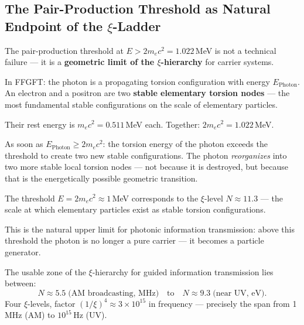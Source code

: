 \subsection{The Pair-Production Threshold as Natural
  Endpoint of the \texorpdfstring{$\xi$}{xi}-Ladder}
\label{sec:pair-production}

The pair-production threshold at $E > 2 m_e c^2 = 1.022$\,MeV
is not a technical failure ---
it is a \textbf{geometric limit of the $\xi$-hierarchy}
for carrier systems.

In FFGFT: the photon is a propagating
torsion configuration with energy $E_\text{Photon}$.
An electron and a positron are two
\textbf{stable elementary torsion nodes} ---
the most fundamental stable configurations
on the scale of elementary particles.

Their rest energy is $m_e c^2 = 0.511$\,MeV each.
Together: $2 m_e c^2 = 1.022$\,MeV.

As soon as $E_\text{Photon} \geq 2 m_e c^2$:
the torsion energy of the photon exceeds
the threshold to create two new stable configurations.
The photon \emph{reorganizes} into
two more stable local torsion nodes ---
not because it is destroyed,
but because that is the energetically possible
geometric transition.

\begin{keyresult}
The threshold $E = 2 m_e c^2 \approx 1$\,MeV
corresponds to the $\xi$-level $N \approx 11.3$ ---
the scale at which elementary particles exist as stable
torsion configurations.

This is the natural upper limit for photonic
information transmission:
above this threshold the photon is no longer
a pure carrier --- it becomes a particle generator.

The usable zone of the $\xi$-hierarchy for
guided information transmission lies between:
\begin{equation}
  N \approx 5.5 \;\text{(AM broadcasting, MHz)}
  \quad\text{to}\quad
  N \approx 9.3 \;\text{(near UV, eV)}.
\end{equation}
Four $\xi$-levels, factor $(1/\xi)^4 \approx 3 \times 10^{15}$
in frequency --- precisely the span from
1\,MHz (AM) to $10^{15}$\,Hz (UV).
\end{keyresult}

